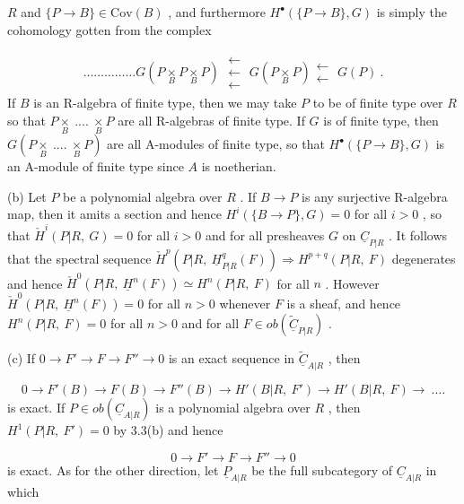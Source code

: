 $R$  and  $\{P \to B\} \in \mathrm{Cov}(B)$  , and furthermore  $H^{\bullet}(\{P \to B\},G)$  is simply the
cohomology gotten from the complex

\begin{multline*}
\dots\dots\dots\dots\dots G(P \underset{B}{\times} P \underset{B}{\times} P) \;\substack{\longleftarrow\\ \longleftarrow\\ \longleftarrow}\; G(P \underset{B}{\times} P) \substack{\longleftarrow\\ \longleftarrow}\; G(P) \ .
\end{multline*}
If  $B$  is an R-algebra of finite type, then we may take  $P$  to be of finite type over  $R$  so that  $P\underset{B}{\times}\ ....\ \underset{B}{\times}P$  are all R-algebras of finite type. If  $G$  is of finite type, then  $G(P\underset{B}{\times}\ ....\ \underset{B}{\times}P)$  are all A-modules of finite type, so that  $H^{\bullet}(\{P \to B\},G)$  is an A-module of finite type since  $A$  is noetherian.

(b)  Let  $P$  be a polynomial algebra over  $R$ . If  $B \to P$  is any surjective R-algebra map, then it amits a section and hence  $H^{i}(\{B \to P\},G) = 0$  for all  $i > 0$ , so that  $\check{H}^{i}(P|R,\ G) = 0$  for all  $i > 0$  and for all presheaves  $G$  on  $\underline{C}_{P|R}$ . It follows that the spectral sequence  $\check{H}^{p}(P|R,\ \underline{H}^{q}_{P|R}(F)) \Rightarrow H^{p+q}(P|R,\ F)$  degenerates and hence  $\check{H}^{0}(P|R,\ \underline{H}^{n}(F)) \simeq H^{n}(P|R,\ F)$  for all  $n$ . However  $\check{H}^{0}(P|R,\ \underline{H}^{n}(F)) = 0$  for all  $n > 0$  whenever  $F$  is a sheaf, and hence  $H^{n}(P|R,\ F) = 0$  for all  $n > 0$  and for all  $F \in ob(\widetilde{\underline{C}}_{P|R})$ .

(c)  If  $0 \to F' \to F \to F'' \to 0$  is an exact sequence in  $\widetilde{\underline{C}}_{A|R}$ , then

\begin{equation*}
0 \to F'(B) \to F(B) \to F''(B) \to H'(B|R,\ F') \to H'(B|R,\ F) \to \ ....
\end{equation*}
is exact. If  $P \in ob(\underline{C}_{A|R})$  is a polynomial algebra over  $R$ , then  $H^{1}(P|R,\ F') = 0$  by 3.3(b) and hence

\begin{equation*}
0 \to F' \to F \to F'' \to 0
\end{equation*}
is exact. As for the other direction, let  $\underline{P}_{A|R}$  be the full subcategory of  $\underline{C}_{A|R}$  in which

